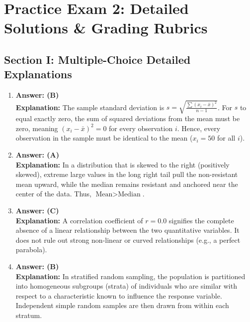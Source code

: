 \chapter{Practice Exam 2: Detailed Solutions \& Grading Rubrics}

\section{Section I: Multiple-Choice Detailed Explanations}

\begin{enumerate}[leftmargin=1.5em]
  \item \textbf{Answer: (B)} \\
  \textbf{Explanation:} The sample standard deviation is $s = \sqrt{\frac{\sum (x_i - \bar{x})^2}{n - 1}}$. For $s$ to equal exactly zero, the sum of squared deviations from the mean must be zero, meaning $(x_i - \bar{x})^2 = 0$ for every observation $i$. Hence, every observation in the sample must be identical to the mean ($x_i = 50$ for all $i$).

  \item \textbf{Answer: (A)} \\
  \textbf{Explanation:} In a distribution that is skewed to the right (positively skewed), extreme large values in the long right tail pull the non-resistant mean upward, while the median remains resistant and anchored near the center of the data. Thus, $\text{Mean} > \text{Median}$.

  \item \textbf{Answer: (C)} \\
  \textbf{Explanation:} A correlation coefficient of $r = 0.0$ signifies the complete absence of a linear relationship between the two quantitative variables. It does not rule out strong non-linear or curved relationships (e.g., a perfect parabola).

  \item \textbf{Answer: (B)} \\
  \textbf{Explanation:} In stratified random sampling, the population is partitioned into homogeneous subgroups (strata) of individuals who are similar with respect to a characteristic known to influence the response variable. Independent simple random samples are then drawn from within each stratum.


\end{enumerate}
